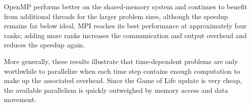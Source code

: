 \documentclass[11pt,a4paper]{article}
\begin{document}
OpenMP performs better on the shared-memory system and continues to benefit
from additional threads for the larger problem sizes, although the speedup
remains far below ideal. MPI reaches its best performance at approximately
four ranks; adding more ranks increases the communication and output overhead
and reduces the speedup again. 

More generally, these results illustrate that time-dependent problems are only
worthwhile to parallelize when each time step contains enough computation to
make up the associated overhead. Since the Game of Life update is very cheap,
the available parallelism is quickly outweighed by memory access and data
movement. 
\end{document}

